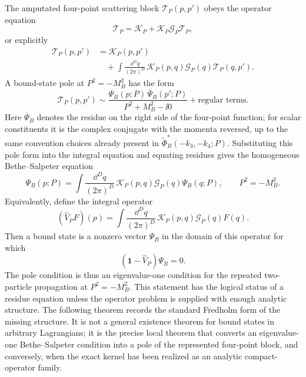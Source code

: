 The amputated four-point scattering block \(\mathcal T_P(p,p')\) obeys the
operator equation
\begin{equation}
  \mathcal T_P
  =
  \mathcal K_P
  +
  \mathcal K_P\mathcal G_P\mathcal T_P ,
  \label{eq:bethe-salpeter-operator-equation}
\end{equation}
or explicitly
\begin{equation}
\begin{aligned}
  \mathcal T_P(p,p')
  &=
  \mathcal K_P(p,p')
\\
  &\quad+
  \int\frac{\dd^D q}{(2\pi)^D}\,
  \mathcal K_P(p,q)\mathcal G_P(q)\mathcal T_P(q,p') .
\end{aligned}
  \label{eq:bethe-salpeter-integral-equation-for-t}
\end{equation}
A bound-state pole at \(P^2=-M_B^2\) has the form
\begin{equation}
  \mathcal T_P(p,p')
  \sim
  \frac{\Psi_B(p;P)\,\overline{\Psi}_B(p';P)}
       {P^2+M_B^2-\ii0}
  +\text{regular terms}.
  \label{eq:bethe-salpeter-amputated-bound-state-pole}
\end{equation}
Here \(\overline{\Psi}_B\) denotes the residue on the right side of the
four-point function; for scalar constituents it is the complex conjugate with
the momenta reversed, up to the same convention choices already present in
\(\widetilde\Phi_B^*(-k_3,-k_4;P)\).
Substituting this pole form into the integral equation and equating residues
gives the homogeneous Bethe--Salpeter equation
\begin{equation}
  \Psi_B(p;P)
  =
  \int\frac{\dd^D q}{(2\pi)^D}\,
  \mathcal K_P(p,q)\mathcal G_P(q)\Psi_B(q;P),
  \qquad
  P^2=-M_B^2 .
  \label{eq:homogeneous-bethe-salpeter-equation}
\end{equation}
Equivalently, define the integral operator
\[
  (\widehat V_P F)(p)
  =
  \int\frac{\dd^D q}{(2\pi)^D}\,
  \mathcal K_P(p,q)\mathcal G_P(q)F(q).
\]
Then a bound state is a nonzero vector \(\Psi_B\) in the domain of this
operator for which
\[
  (\mathbf 1-\widehat V_P)\Psi_B=0 .
\]
The pole condition is thus an eigenvalue-one condition for the repeated
two-particle propagation at \(P^2=-M_B^2\).
This statement has the logical status of a residue equation unless the
operator problem is supplied with enough analytic structure.  The following
theorem records the standard Fredholm form of the missing structure.  It is
not a general existence theorem for bound states in arbitrary Lagrangians; it
is the precise local theorem that converts an eigenvalue-one Bethe--Salpeter
condition into a pole of the represented four-point block, and conversely,
when the exact kernel has been realized as an analytic compact-operator
family.

